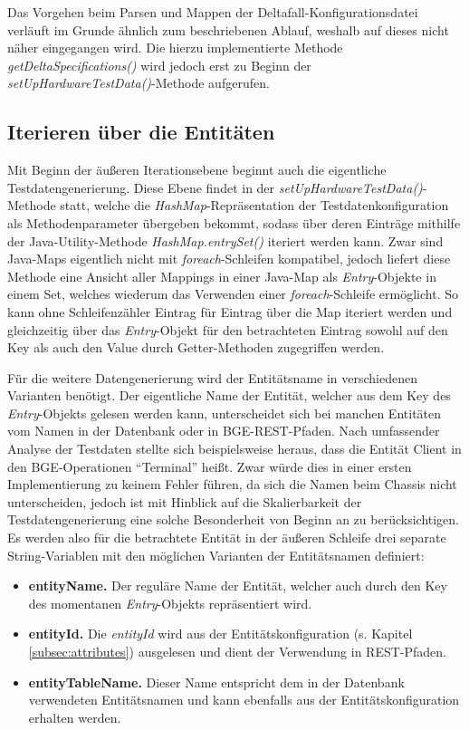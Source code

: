 Das Vorgehen beim Parsen und Mappen der Deltafall-Konfigurationsdatei verläuft im Grunde ähnlich zum beschriebenen Ablauf, weshalb auf dieses nicht näher eingegangen wird. Die hierzu implementierte Methode \textit{getDeltaSpecifications()} wird jedoch erst zu Beginn der \textit{setUpHardwareTestData()}-Methode aufgerufen.

\subsection{Iterieren über die Entitäten}\label{subsec:iterationEntities}
Mit Beginn der äußeren Iterationsebene beginnt auch die eigentliche Testdatengenerierung. Diese Ebene findet in der \textit{setUpHardwareTestData()}-Methode statt, welche die \textit{HashMap}-Repräsentation der Testdatenkonfiguration als Methodenparameter übergeben bekommt, sodass über deren Einträge mithilfe der Java-Utility-Methode \textit{HashMap.entrySet()} iteriert werden kann. Zwar sind Java-Maps eigentlich nicht mit \textit{foreach}-Schleifen kompatibel, jedoch liefert diese Methode eine Ansicht aller Mappings in einer Java-Map als \textit{Entry}-Objekte in einem Set, welches wiederum das Verwenden einer \textit{foreach}-Schleife ermöglicht. So kann ohne Schleifenzähler Eintrag für Eintrag über die Map iteriert werden und gleichzeitig über das \textit{Entry}-Objekt für den betrachteten Eintrag sowohl auf den Key als auch den Value durch Getter-Methoden zugegriffen werden.

Für die weitere Datengenerierung wird der Entitätsname in verschiedenen Varianten benötigt. Der eigentliche Name der Entität, welcher aus dem Key des \textit{Entry}-Objekts gelesen werden kann, unterscheidet sich bei manchen Entitäten vom Namen in der Datenbank oder in \ac{BGE}-\ac{REST}-Pfaden. Nach umfassender Analyse der Testdaten stellte sich beispielsweise heraus, dass die Entität Client in den \ac{BGE}-Operationen \enquote{Terminal} heißt. Zwar würde dies in einer ersten Implementierung zu keinem Fehler führen, da sich die Namen beim Chassis nicht unterscheiden, jedoch ist mit Hinblick auf die Skalierbarkeit der Testdatengenerierung eine solche Besonderheit von Beginn an zu berücksichtigen. Es werden also für die betrachtete Entität in der äußeren Schleife drei separate String-Variablen mit den möglichen Varianten der Entitätsnamen definiert:

\begin{itemize}
    \item \textbf{entityName.} Der reguläre Name der Entität, welcher auch durch den Key des momentanen \textit{Entry}-Objekts repräsentiert wird.
    \item \textbf{entityId.} Die \textit{entityId} wird aus der Entitätskonfiguration (s. Kapitel \ref{subsec:attributes}) ausgelesen und dient der Verwendung in \ac{REST}-Pfaden.
    \item \textbf{entityTableName.} Dieser Name entspricht dem in der Datenbank verwendeten Entitätsnamen und kann ebenfalls aus der Entitätskonfiguration erhalten werden.
\end{itemize}

